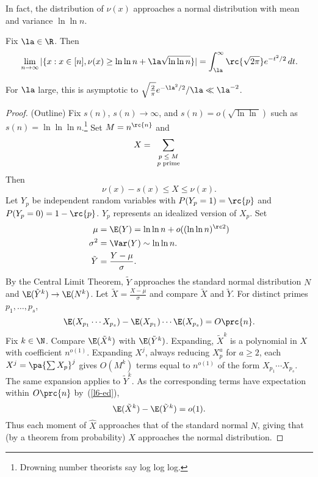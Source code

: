 In fact, %
the 
distribution of $\nu(x)$ approaches a normal distribution with mean and variance $\ln \ln n$.
\begin{thm}
Fix $\la\in \R$. Then
\[
\lim_{n\to \infty} |\{x:x\in [n],\nu(x)\geq \ln \ln n +\la\sqrt{\ln \ln n}\}|
=
\int_{\la}^{\infty} \rc{\sqrt{2\pi}}e^{-t^2/2}\,dt.
\]
\end{thm}
For $\la$ large, this is asymptotic to $\sqrt{\frac{2}{\pi}}e^{-\la^2/2}/\la\ll\la^{-2}$.
\begin{proof}(Outline)
Fix $s(n)$, $s(n)\to \infty$, and $s(n)=o(\sqrt{\ln\ln })$ such as $s(n)=\ln\ln\ln n$.\footnote{Drowning number theorists say log log log.}
Set $M=n^{\rc{n}}$ and \[X=\sum_{\scriptsize \begin{array}{c}
p\leq M\\p\text{ prime}
\end{array}}
\]
Then
\[
\nu(x)-s(x)\leq X\leq \nu(x).\]
Let $Y_p$ be independent random variables with $P(Y_p=1)=\rc{p}$ and $P(Y_p=0)=1-\rc{p}$. $Y_p$ represents an idealized version of $X_p$. %
Set
\begin{align*}
\mu&=\E(Y)=\ln \ln n+o((\ln \ln n)^{\rc 2})\\ 
\sigma^2&=\Var(Y)\sim \ln \ln n.\\
\tilde{Y}&=\frac{Y-\mu}{\sigma}.
\end{align*}
By the Central Limit Theorem, $\tilde Y$ approaches the standard normal distribution $N$ and $\E(\tilde{Y}^k)\to \E(N^k)$. %
Let $\tilde X=\frac{X-\mu}{\sigma}$ and compare $\tilde X$ and $\tilde Y$. For distinct primes $p_1,\ldots, p_s$, %
\begin{equation}\label{l6-ed}
\E(X_{p_1}\cdots X_{p_s})-\E(X_{p_1})\cdots \E(X_{p_s})=O\prc{n}.
\end{equation}
Fix $k\in \N$. Compare $\E(\tilde{X}^k)$ with $\E(\tilde Y^k)$. Expanding, $\tilde X^k$ is a polynomial in $X$ with coefficient $n^{o(1)}$. Expanding $X^j$, always reducing $X_p^a$ for $a\geq 2$, each $X^j=\pa{\sum X_p}^j$ gives $O(M^k)$ terms equal to $n^{o(1)}$ of the form $X_{p_1}\cdots X_{p_s}$. The same expansion applies to $\tilde Y^k$. As the corresponding terms have expectation within $O\prc{n}$ by~(\ref{l6-ed}),
\[
\E(\tilde X^k)-\E(\tilde Y^k)=o(1).
\]
Thus each moment of $\hat X$ approaches that of the standard normal $N$, giving that (by a theorem from probability) $\hat X$ approaches the normal distribution.
\end{proof}